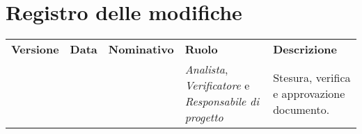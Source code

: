 % 
\section*{Registro delle modifiche}
\begin{longtable} {
		>{\centering}p{17mm} 
		>{\centering}p{19.5mm}
		>{\centering}p{24mm} 
		>{\centering}p{24mm} 
		>{}p{32mm}}
	\rowcolor{gray!50}
	\textbf{Versione} & \textbf{Data} & \textbf{Nominativo} & \textbf{Ruolo} & \textbf{Descrizione} \TBstrut \\
	 &  &  & \textit{Analista}, \textit{Verificatore} e \textit{Responsabile di progetto} & Stesura, verifica e approvazione documento. \TBstrut \\ [2mm]
\end{longtable}
